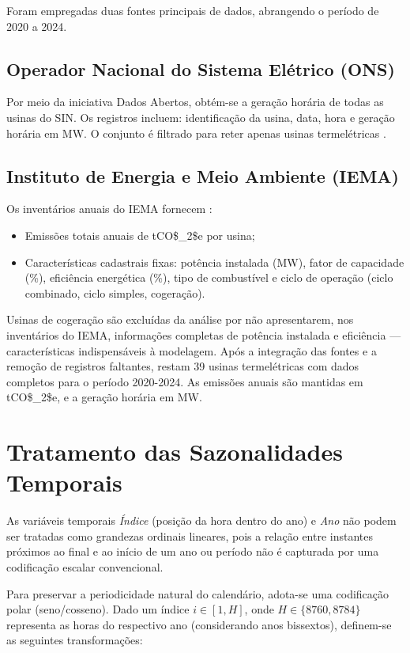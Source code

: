 Foram empregadas duas fontes principais de dados, abrangendo o período de 2020 a 2024.

\subsection{Operador Nacional do Sistema Elétrico (\ac{ONS})}

Por meio da iniciativa Dados Abertos, obtém-se a geração horária de todas as usinas do \ac{SIN}. Os registros incluem: identificação da usina, data, hora e geração horária em MW. O conjunto é filtrado para reter apenas usinas termelétricas \cite{ons_dados}.

\subsection{Instituto de Energia e Meio Ambiente (\ac{IEMA})}

Os inventários anuais do \ac{IEMA} fornecem \cite{iema2022, iema2023, iema2024}:
\begin{itemize}
    \item Emissões totais anuais de \ac{tCO$_2$e} por usina;
    \item Características cadastrais fixas: potência instalada (MW), fator de capacidade (\%), eficiência energética (\%), tipo de combustível e ciclo de operação (ciclo combinado, ciclo simples, cogeração).
\end{itemize}

Usinas de cogeração são excluídas da análise por não apresentarem, nos inventários do \ac{IEMA}, informações completas de potência instalada e eficiência — características indispensáveis à modelagem. Após a integração das fontes e a remoção de registros faltantes, restam 39 usinas termelétricas com dados completos para o período 2020-2024. As emissões anuais são mantidas em \ac{tCO$_2$e}, e a geração horária em MW.

\section{Tratamento das Sazonalidades Temporais}

As variáveis temporais \textit{Índice} (posição da hora dentro do ano) e \textit{Ano} não podem ser tratadas como grandezas ordinais lineares, pois a relação entre instantes próximos ao final e ao início de um ano ou período não é capturada por uma codificação escalar convencional.

Para preservar a periodicidade natural do calendário, adota-se uma codificação polar (seno/cosseno). Dado um índice \(i \in [1, H]\), onde \(H \in \{8760, 8784\}\) representa as horas do respectivo ano (considerando anos bissextos), definem-se as seguintes transformações:

